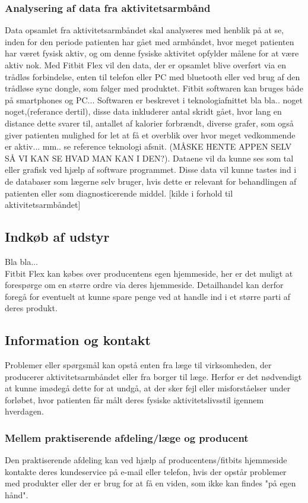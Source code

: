 \subsubsection{Analysering af data fra aktivitetsarmbånd}  
Data opsamlet fra aktivitetsarmbåndet skal analyseres med henblik på at se, inden for den periode patienten har gået med armbåndet, hvor meget patienten har været fysisk aktiv, og om denne fysiske aktivitet opfylder målene for at være aktiv nok.  
Med Fitbit Flex vil den data, der er opsamlet blive overført via en trådløs forbindelse, enten til telefon eller PC med bluetooth eller ved brug af den trådløse sync dongle, som følger med produktet. Fitbit softwaren kan bruges både på smartphones og PC... Softwaren er beskrevet i teknologiafnittet bla bla.. noget noget,(referance dertil), disse data inkluderer antal skridt gået, hvor lang en distance dette svarer til, antallet af kalorier forbrændt, diverse grafer, som også giver patienten mulighed for let at få et overblik over hvor meget vedkommende er aktiv... mm.. se reference teknologi afsnit. (MÅSKE HENTE APPEN SELV SÅ VI KAN SE HVAD MAN KAN I DEN?). Dataene vil da kunne ses som tal eller grafisk ved hjælp af software programmet. Disse data vil kunne tastes ind i de databaser som lægerne selv bruger, hvis dette er relevant for behandlingen af patienten eller som diagnosticerende middel. [kilde i forhold til aktivitetsarmbåndet]

\subsection{Indkøb af udstyr}	
Bla bla...\\
Fitbit Flex kan købes over producentens egen hjemmeside, her er det muligt at forespørge om en større ordre via deres hjemmeside. Detailhandel kan derfor foregå for eventuelt at kunne spare penge ved at handle ind i et større parti af deres produkt.

\subsection{Information og kontakt}
Problemer eller spørgsmål kan opstå enten fra læge til virksomheden, der producerer aktivitetsarmbåndet eller fra borger til læge. Herfor er det nødvendigt at kunne imødegå dette for at undgå, at der sker fejl eller misforståelser under forløbet, hvor patienten får målt deres fysiske aktivitetslivsstil igennem hverdagen. 

\subsubsection{Mellem praktiserende afdeling/læge og producent}
Den praktiserende afdeling kan ved hjælp af producentens/fitbits hjemmeside kontakte deres kundeservice på e-mail eller telefon, hvis der opstår problemer med produkter eller der er brug for at få en viden, som ikke kan findes "på egen hånd". 

